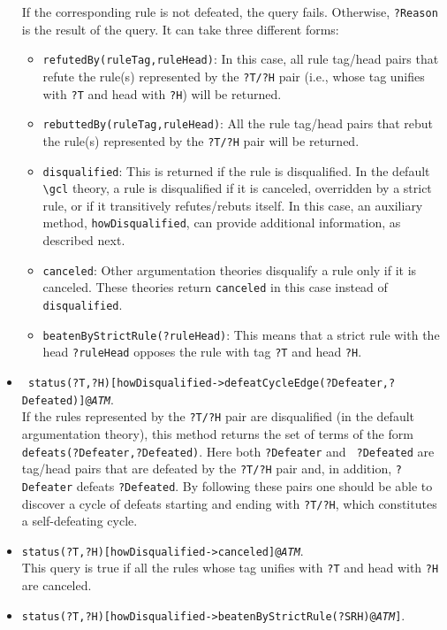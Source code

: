 \documentclass[11pt]{article}
\newcommand{\bs}{\textbackslash}
\begin{document}
\begin{itemize}
  If the corresponding rule is not defeated, the query fails.  Otherwise,
  {\tt ?Reason} is the result of the query. It can take three different forms:
  \begin{itemize}
  \item {\tt refutedBy(ruleTag,ruleHead)}: In this case, all rule
    tag/head pairs that refute the rule(s) represented by the {\tt ?T/?H}
    pair (i.e., whose tag unifies with {\tt ?T} and head with {\tt ?H})
    will be returned.
  \item {\tt rebuttedBy(ruleTag,ruleHead)}: All the rule
    tag/head pairs that rebut the rule(s) represented by the {\tt ?T/?H} pair
    will be returned.
  \item {\tt disqualified}: This is returned if the rule is
    disqualified.
    In the default {\tt \bs{}gcl} theory, a rule is
    disqualified if it is canceled, overridden by a strict rule,
    or if it transitively refutes/rebuts itself.
    In this case, an auxiliary method, {\tt howDisqualified}, can provide
    additional information, as described next. 
  \item {\tt canceled}: Other argumentation theories disqualify a rule only
    if it is canceled. These theories return \texttt{canceled} in this case
    instead of \texttt{disqualified}.
  \item \texttt{beatenByStrictRule(?ruleHead)}: This means that a strict
    rule with the head \texttt{?ruleHead} opposes the rule with tag
    \texttt{?T} and head \texttt{?H}.  
  \end{itemize}
\item  {\tt
    status(?T,?H)[howDisqualified->defeatCycleEdge(?Defeater,?Defeated)]@\emph{ATM}}.\\
  If the rules represented by the {\tt ?T/?H} pair are disqualified (in the
  default argumentation theory), this
  method returns the set of terms of the form {\tt
    defeats(?Defeater,?Defeated)}. Here both {\tt ?Defeater} and {\tt
    ?Defeated} are tag/head pairs that are defeated by the {\tt ?T/?H} pair
  and, in addition, {\tt ?Defeater} defeats {\tt ?Defeated}. By following
  these pairs one should be able
  to discover a cycle of defeats starting and ending
  with {\tt ?T/?H}, which constitutes a self-defeating cycle.
\item  {\tt status(?T,?H)[howDisqualified->canceled]@\emph{ATM}}.\\
  This query is true if all the rules whose tag unifies with
  {\tt ?T} and head with {\tt ?H} are
  canceled.
\item  {\tt status(?T,?H)[howDisqualified->beatenByStrictRule(?SRH)@\emph{ATM}]}.\\

\end{itemize}
\end{document}
